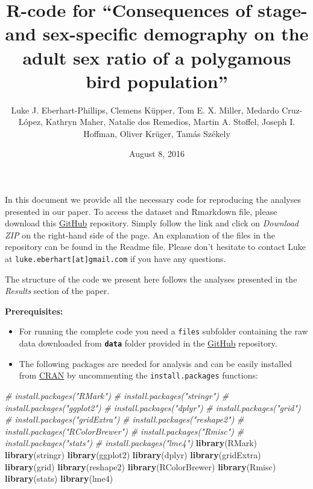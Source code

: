\documentclass[]{article}
\title{R-code for ``Consequences of stage- and sex-specific demography on the
adult sex ratio of a polygamous bird population''}
\author{Luke J. Eberhart-Phillips, Clemens Küpper, Tom E. X. Miller, Medardo
Cruz-López, Kathryn Maher, Natalie dos Remedios, Martin A. Stoffel,
Joseph I. Hoffman, Oliver Krüger, Tamás Székely}
\date{August 8, 2016}
\newenvironment{Shaded}{\begin{snugshade}}{\end{snugshade}}
\newcommand{\KeywordTok}[1]{\textcolor[rgb]{0.13,0.29,0.53}{\textbf{{#1}}}}
\newcommand{\CommentTok}[1]{\textcolor[rgb]{0.56,0.35,0.01}{\textit{{#1}}}}
\newcommand{\NormalTok}[1]{{#1}}
\providecommand{\tightlist}{%
  \setlength{\itemsep}{0pt}\setlength{\parskip}{0pt}}
\begin{document}
\maketitle

In this document we provide all the necessary code for reproducing the
analyses presented in our paper. To access the dataset and Rmarkdown
file, please download this
\href{https://github.com/leberhartphillips/Ceuta_ASR_matrix_modeling}{GitHub}
repository. Simply follow the link and click on \emph{Download ZIP} on
the right-hand side of the page. An explanation of the files in the
repository can be found in the Readme file. Please don't hesitate to
contact Luke at \texttt{luke.eberhart{[}at{]}gmail.com} if you have any
questions.

The structure of the code we present here follows the analyses presented
in the \emph{Results} section of the paper.

\textbf{Prerequisites:}

\begin{itemize}
\tightlist
\item
  For running the complete code you need a \texttt{files} subfolder
  containing the raw data downloaded from \textbf{\texttt{data}} folder
  provided in the
  \href{https://github.com/leberhartphillips/Ceuta_ASR_matrix_modeling}{GitHub}
  repository.
\item
  The following packages are needed for analysis and can be easily
  installed from \href{http://cran.r-project.org/}{CRAN} by uncommenting
  the \texttt{install.packages} functions:
\end{itemize}

\begin{Shaded}
\begin{Highlighting}[]
\CommentTok{# install.packages("RMark")}
\CommentTok{# install.packages("stringr")}
\CommentTok{# install.packages("ggplot2")}
\CommentTok{# install.packages("dplyr")}
\CommentTok{# install.packages("grid")}
\CommentTok{# install.packages("gridExtra")}
\CommentTok{# install.packages("reshape2")}
\CommentTok{# install.packages("RColorBrewer")}
\CommentTok{# install.packages("Rmisc")}
\CommentTok{# install.packages("stats")}
\CommentTok{# install.packages("lme4")}
\KeywordTok{library}\NormalTok{(RMark) }
\KeywordTok{library}\NormalTok{(stringr)}
\KeywordTok{library}\NormalTok{(ggplot2)}
\KeywordTok{library}\NormalTok{(dplyr)}
\KeywordTok{library}\NormalTok{(gridExtra)}
\KeywordTok{library}\NormalTok{(grid)}
\KeywordTok{library}\NormalTok{(reshape2)}
\KeywordTok{library}\NormalTok{(RColorBrewer)}
\KeywordTok{library}\NormalTok{(Rmisc)}
\KeywordTok{library}\NormalTok{(stats)}
\KeywordTok{library}\NormalTok{(lme4)}
\end{Highlighting}
\end{Shaded}
\end{document}
